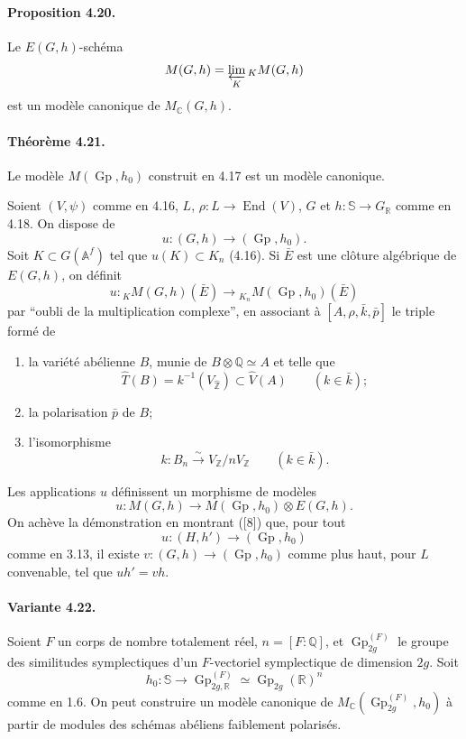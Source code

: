 \documentclass[10pt]{article}
\newcommand{\Af}{\mathbb A^f}
\newcommand{\C}{\mathbb C}
\newcommand{\Q}{\mathbb Q}
\newcommand{\R}{\mathbb R}
\newcommand{\Z}{\mathbb Z}
\newcommand{\bS}{\mathbb S}
\newcommand{\Gp}{\operatorname{Gp}}
\newcommand{\End}{\operatorname{End}}
\begin{document}
\paragraph{Proposition 4.20.} Le $E(G,h)$-schéma
\[
M(G,h)=\varprojlim_K {}_K M(G,h)
\]
est un modèle canonique de $M_{\C}(G,h)$.

\paragraph{Théorème 4.21.} Le modèle $M(\Gp,h_0)$ construit en 4.17 est un modèle canonique.

Soient $(V,\psi)$ comme en 4.16, $L$, $\rho:L\to\End(V)$, $G$ et $h:\bS\to G_\R$ comme en 4.18. On dispose de
\[
u:(G,h)\longrightarrow(\Gp,h_0).
\]
Soit $K\subset G(\Af)$ tel que $u(K)\subset K_n$ (4.16). Si $\bar E$ est une clôture algébrique de $E(G,h)$, on définit
\[
u:{}_K M(G,h)(\bar E)\longrightarrow{}_{K_n}M(\Gp,h_0)(\bar E)
\]
par ``oubli de la multiplication complexe'', en associant à $[A,\rho,\bar k,\bar p]$ le triple formé de
\begin{enumerate}[label=(\alph*)]
\item la variété abélienne $B$, munie de $B\otimes\Q\simeq A$ et telle que
\[
\widehat T(B)=k^{-1}(V_{\widehat{\Z}})\subset\widehat V(A)\qquad(k\in\bar k);
\]
\item la polarisation $\bar p$ de $B$;
\item l'isomorphisme
\[
k:B_n\xrightarrow{\sim}V_\Z/nV_\Z\qquad(k\in\bar k).
\]
\end{enumerate}
Les applications $u$ définissent un morphisme de modèles
\[
u:M(G,h)\longrightarrow M(\Gp,h_0)\otimes E(G,h).
\]
On achève la démonstration en montrant ([8]) que, pour tout
\[
u:(H,h')\longrightarrow(\Gp,h_0)
\]
comme en 3.13, il existe $v:(G,h)\longrightarrow(\Gp,h_0)$ comme plus haut, pour $L$ convenable, tel que $uh'=vh$.

\paragraph{Variante 4.22.} Soient $F$ un corps de nombre totalement réel, $n=[F:\Q]$, et $\Gp_{2g}^{(F)}$ le groupe des similitudes symplectiques d'un $F$-vectoriel symplectique de dimension $2g$. Soit
\[
h_0:\bS\longrightarrow \Gp_{2g,\R}^{(F)}\simeq \Gp_{2g}(\R)^n
\]
comme en 1.6. On peut construire un modèle canonique de $M_{\C}(\Gp_{2g}^{(F)},h_0)$ à partir de modules des schémas abéliens faiblement polarisés.
\end{document}
